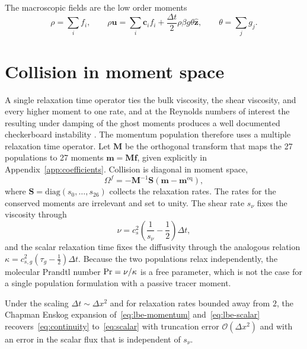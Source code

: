 The macroscopic fields are the low order moments
\begin{equation}
  \rho = \sum_i f_i, \qquad
  \rho \mathbf{u} = \sum_i \mathbf{c}_i f_i + \frac{\Delta t}{2} \rho \beta g \theta \hat{\mathbf{z}}, \qquad
  \theta = \sum_j g_j.
  \label{eq:moments}
\end{equation}

\section{Collision in moment space}
\label{sec:theory-mrt}

A single relaxation time operator ties the bulk viscosity, the shear viscosity,
and every higher moment to one rate, and at the Reynolds numbers of interest the
resulting under damping of the ghost moments produces a well documented
checkerboard instability \citep{manov2017mrt}. The momentum population therefore
uses a multiple relaxation time operator. Let $\mathbf{M}$ be the orthogonal
transform that maps the 27 populations to 27 moments $\mathbf{m} = \mathbf{M}\mathbf{f}$,
given explicitly in Appendix~\ref{app:coefficients}. Collision is diagonal in
moment space,
\begin{equation}
  \Omega^{f} = -\mathbf{M}^{-1} \mathbf{S} \left( \mathbf{m} - \mathbf{m}^{\mathrm{eq}} \right),
  \label{eq:mrt-collision}
\end{equation}
where $\mathbf{S} = \mathrm{diag}(s_0, \dots, s_{26})$ collects the relaxation
rates. The rates for the conserved moments are irrelevant and set to unity. The
shear rate $s_\nu$ fixes the viscosity through
\begin{equation}
  \nu = c_s^{2} \left( \frac{1}{s_\nu} - \frac{1}{2} \right) \Delta t,
  \label{eq:viscosity}
\end{equation}
and the scalar relaxation time fixes the diffusivity through the analogous
relation $\kappa = c_{s,g}^{2}(\tau_g - \tfrac{1}{2})\Delta t$. Because the two
populations relax independently, the molecular Prandtl number
$\mathrm{Pr} = \nu / \kappa$ is a free parameter, which is not the case for a single
population formulation with a passive tracer moment.

\begin{proposition}
\label{prop:consistency}
Under the scaling $\Delta t \sim \Delta x^{2}$ and for relaxation rates bounded
away from $2$, the Chapman Enskog expansion of~\eqref{eq:lbe-momentum}
and~\eqref{eq:lbe-scalar} recovers~\eqref{eq:continuity} to~\eqref{eq:scalar}
with truncation error $\mathcal{O}(\Delta x^{2})$ and with an error in the
scalar flux that is independent of $s_\nu$.
\end{proposition}

